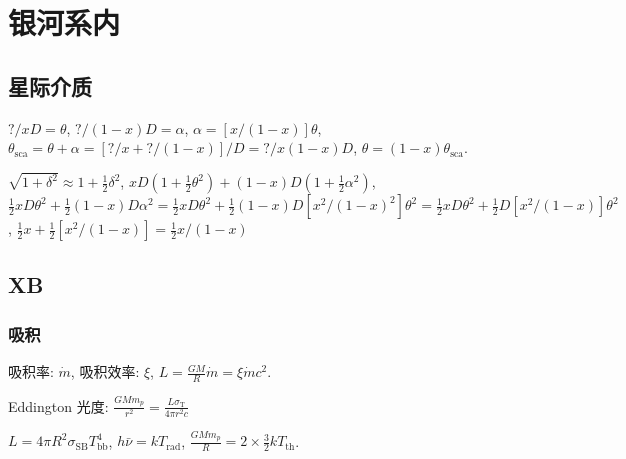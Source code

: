 \chapter{银河系内}

\section{星际介质}

$?/xD=\theta$, $?/(1-x)D=\alpha$, $\alpha=[x/(1-x)]\theta$, $\theta_\text{sca}=\theta+\alpha=[?/x+?/(1-x)]/D=?/x(1-x)D$, $\theta=(1-x)\theta_\text{sca}$.

$\sqrt{1+\delta^2}\approx1+\frac{1}{2}\delta^2$, $xD(1+\frac{1}{2}\theta^2)+(1-x)D(1+\frac{1}{2}\alpha^2)$, $\frac{1}{2}xD\theta^2+\frac{1}{2}(1-x)D\alpha^2=\frac{1}{2}xD\theta^2+\frac{1}{2}(1-x)D[x^2/(1-x)^2]\theta^2=\frac{1}{2}xD\theta^2+\frac{1}{2}D[x^2/(1-x)]\theta^2$, $\frac{1}{2}x+\frac{1}{2}[x^2/(1-x)]=\frac{1}{2}x/(1-x)$

\section{XB}

\subsection{吸积}

吸积率: $\dot{m}$, 吸积效率: $\xi$, $L=\frac{GM}{R}\dot{m}=\xi\dot{m}c^2$.

Eddington 光度: $\frac{GMm_p}{r^2}=\frac{L\sigma_\text{T}}{4\pi r^2c}$

$L=4\pi R^2\sigma_\text{SB}T_\text{bb}^4$, $h\bar{\nu}=kT_\text{rad}$, $\frac{GMm_p}{R}=2\times\frac{3}{2}kT_\text{th}$.
